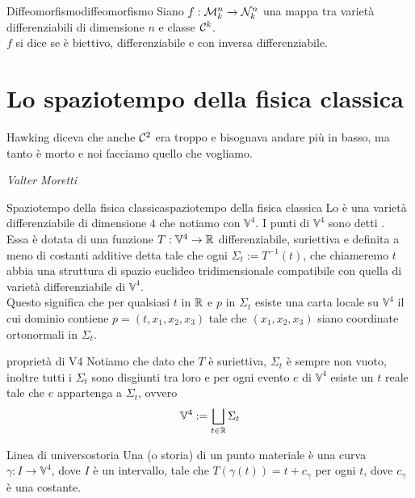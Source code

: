 \documentclass[annatarbolditalic, openany]{book}
\renewcommand\V{\mathbb{V}}
\begin{document}
\begin{definition}{Diffeomorfismo}{diffeomorfismo}
    Siano $f : \mathcal{M}_k^n \to \mathcal{N}_k^n$ una mappa tra varietà differenziabili di dimensione $n$ e classe $\mathcal{C}^k$.\\
    $f$ si dice  se è biettivo, differenziabile e con inversa differenziabile.
\end{definition}

\section{Lo spaziotempo della fisica classica}

\epigraph{Hawking diceva che anche $\mathcal{C}^2$ era troppo e bisognava andare più in basso, ma tanto è morto e noi facciamo quello che vogliamo.}{\textit{Valter Moretti}}

\begin{definition}{Spaziotempo della fisica classica}{spaziotempo della fisica classica}
    Lo  è una varietà differenziabile di dimensione $4$ che notiamo con $\V^4$. I punti di $\V^4$ sono detti .\\
    Essa è dotata di una funzione $T : \V^4 \to \R$ differenziabile, suriettiva e definita a meno di costanti additive detta  tale che ogni $\Sigma_t := T^{-1}(t)$, che chiameremo  $t$ abbia una struttura di spazio euclideo tridimensionale compatibile con quella di varietà differenziabile di $\V^4$.\\
    Questo significa che per qualsiasi $t$ in $\mathbb{R}$ e $p$ in $\Sigma_t$ esiste una carta locale su $\V^4$ il cui dominio contiene $p = (t,x_1,x_2,x_3)$ tale che $(x_1,x_2,x_3)$ siano coordinate ortonormali in $\Sigma_t$.
\end{definition}

\begin{remark}{}{proprietà di V4}
    Notiamo che dato che $T$ è suriettiva, $\Sigma_t$ è sempre non vuoto, inoltre tutti i $\Sigma_t$ sono disgiunti tra loro e per ogni evento $e$ di $\V^4$ esiste un $t$ reale tale che $e$ appartenga a $\Sigma_t$, ovvero
    \[ \V^4 := \bigsqcup_{t \in \R}  \Sigma_t \]
\end{remark}

\begin{definition}{Linea di universo}{storia}
    Una  (o storia) di un punto materiale è una curva $\gamma : I \to \V^4$, dove $I$ è un intervallo, tale che $T(\gamma(t)) = t + c_\gamma$ per ogni $t$, dove $c_\gamma$ è una costante.
\end{definition}
\end{document}
